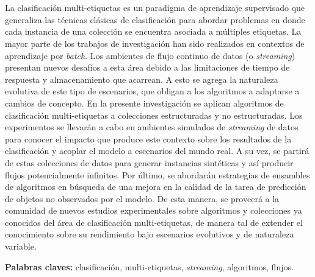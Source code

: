 \chapter*{\runtitulo}

\noindent
La clasificación multi-etiquetas es un paradigma de aprendizaje supervisado que generaliza las técnicas clásicas de clasificación para abordar problemas en donde cada instancia de una colección se encuentra asociada a múltiples etiquetas. La mayor parte de los trabajos de investigación han sido realizados en contextos de aprendizaje por \textit{batch}. Los ambientes de flujo continuo de datos  (o \textit{streaming}) presentan nuevos desafíos a esta área debido a las limitaciones de tiempo de respuesta y almacenamiento que acarrean. A esto se agrega la naturaleza evolutiva de este tipo de escenarios, que obligan a los algoritmos a adaptarse a cambios de concepto. En la presente investigación se aplican algoritmos de clasificación multi-etiquetas a colecciones estructuradas y no estructuradas. Los experimentos se llevarán a cabo en ambientes simulados de \textit{streaming} de datos para conocer el impacto que produce este contexto sobre los resultados de la clasificación y acoplar el modelo a escenarios del mundo real. A su vez, se partirá de estas colecciones de datos para generar instancias sintéticas y así producir flujos potencialmente infinitos. Por último, se abordarán estrategias de ensambles de algoritmos en búsqueda de una mejora en la calidad de la tarea de predicción de objetos no observados por el modelo. De esta manera, se proveerá a la comunidad de nuevos estudios experimentales sobre algoritmos y colecciones ya conocidos del área de clasificación multi-etiquetas, de manera tal de extender el conocimiento sobre su rendimiento bajo escenarios evolutivos y de naturaleza variable.

\bigskip

\noindent\textbf{Palabras claves:} clasificación, multi-etiquetas, \textit{streaming}, algoritmos, flujos.

